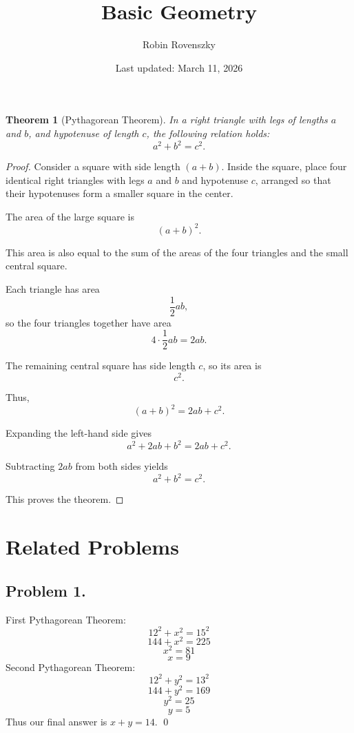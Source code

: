 \documentclass{article}
\title{Basic Geometry}
\author{Robin Rovenszky}
\date{Last updated: March 11, 2026}
\newtheorem{theorem}{Theorem}
\begin{document}
\maketitle
\tableofcontents
\newpage

\begin{theorem}[Pythagorean Theorem]
In a right triangle with legs of lengths $a$ and $b$, and hypotenuse of length $c$, the following relation holds:
\[
a^2 + b^2 = c^2.
\]
\end{theorem}

\begin{proof}
Consider a square with side length $(a+b)$. Inside the square, place four identical right triangles with legs $a$ and $b$ and hypotenuse $c$, arranged so that their hypotenuses form a smaller square in the center.

The area of the large square is
\[
(a+b)^2.
\]

This area is also equal to the sum of the areas of the four triangles and the small central square.

Each triangle has area
\[
\frac{1}{2}ab,
\]
so the four triangles together have area
\[
4 \cdot \frac{1}{2}ab = 2ab.
\]

The remaining central square has side length $c$, so its area is
\[
c^2.
\]

Thus,
\[
(a+b)^2 = 2ab + c^2.
\]

Expanding the left-hand side gives
\[
a^2 + 2ab + b^2 = 2ab + c^2.
\]

Subtracting $2ab$ from both sides yields
\[
a^2 + b^2 = c^2.
\]

This proves the theorem.
\end{proof}

\newpage

\section{Related Problems}
\subsection{Problem 1.}

First Pythagorean Theorem:
\begin{equation}
    12^2 + x^2 = 15^2
\end{equation}
\begin{equation}
    144+x^2 = 225
\end{equation}
\begin{equation}
    x^2 = 81
\end{equation}
\begin{equation}
    x = 9
\end{equation}
Second Pythagorean Theorem:
\begin{equation}
    12^2 + y^2 = 13^2
\end{equation}
\begin{equation}
    144 + y^2 = 169
\end{equation}
\begin{equation}
    y^2 = 25
\end{equation}
\begin{equation}
    y = 5
\end{equation}
Thus our final answer is $x + y = 14$. \qed
\end{document}
